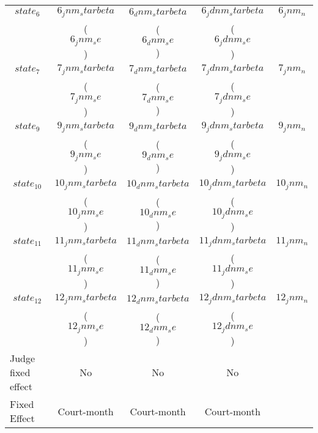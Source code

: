 {\begin{tabular}{l*{4}{c}}
$$state_6$$ \hspace{15mm} & $$6_jnm_starbeta$$ & $$6_dnm_starbeta$$ & $$6_jdnm_starbeta$$ & $$6_jnm_n$$ \\
                          & ($$6_jnm_se$$)     & ($$6_dnm_se$$)     & ($$6_jdnm_se$$)                   \\[2.5mm]
\hline

$$state_7$$ \hspace{15mm} & $$7_jnm_starbeta$$ & $$7_dnm_starbeta$$ & $$7_jdnm_starbeta$$ & $$7_jnm_n$$ \\
                          & ($$7_jnm_se$$)     & ($$7_dnm_se$$)     & ($$7_jdnm_se$$)                   \\[2.5mm]
\hline

$$state_9$$ \hspace{15mm} & $$9_jnm_starbeta$$ & $$9_dnm_starbeta$$ & $$9_jdnm_starbeta$$ & $$9_jnm_n$$ \\
                          & ($$9_jnm_se$$)     & ($$9_dnm_se$$)     & ($$9_jdnm_se$$)                   \\[2.5mm]
\hline

$$state_10$$ \hspace{15mm} & $$10_jnm_starbeta$$ & $$10_dnm_starbeta$$ & $$10_jdnm_starbeta$$ & $$10_jnm_n$$ \\
                           & ($$10_jnm_se$$)     & ($$10_dnm_se$$)     & ($$10_jdnm_se$$)                    \\[2.5mm]
\hline

$$state_11$$ \hspace{15mm} & $$11_jnm_starbeta$$ & $$11_dnm_starbeta$$ & $$11_jdnm_starbeta$$ & $$11_jnm_n$$ \\
                           & ($$11_jnm_se$$)     & ($$11_dnm_se$$)     & ($$11_jdnm_se$$)                    \\[2.5mm]
\hline

$$state_12$$ \hspace{15mm} & $$12_jnm_starbeta$$ & $$12_dnm_starbeta$$ & $$12_jdnm_starbeta$$ & $$12_jnm_n$$ \\
                           & ($$12_jnm_se$$)     & ($$12_dnm_se$$)     & ($$12_jdnm_se$$)                    \\[2.5mm]
\hline

Judge fixed effect & No          & No          & No          \\
Fixed Effect       & Court-month & Court-month & Court-month \\
\hline\hline
\end{tabular}
}
 
